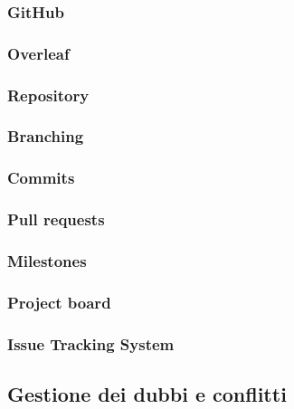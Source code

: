         \subsubsection{GitHub}
        \subsubsection{Overleaf}
        \subsubsection{Repository}
        \subsubsection{Branching}
        \subsubsection{Commits}
        \subsubsection{Pull requests}
        \subsubsection{Milestones}
        \subsubsection{Project board}
        \subsubsection{Issue Tracking System}

    \subsection{Gestione dei dubbi e conflitti}
